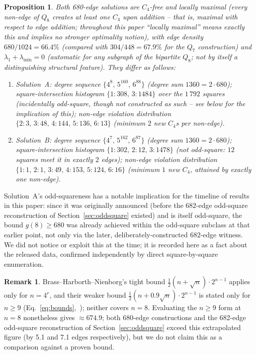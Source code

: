 \documentclass[12pt,a4paper]{article}
\newtheorem{proposition}[theorem]{Proposition}
\theoremstyle{definition}
\newtheorem{remark}[theorem]{Remark}
\begin{document}
\begin{proposition}\label{prop:q8struct}
Both 680-edge solutions are $C_4$-free and locally maximal (every
non-edge of $Q_8$ creates at least one $C_4$ upon addition -- that is,
maximal with respect to edge addition; throughout this paper ``locally
maximal'' means exactly this and implies no stronger optimality
notion), with edge
density $680/1024=66.4\%$ (compared with $304/448=67.9\%$ for the $Q_7$
construction) and $\lambda_1+\lambda_{\min}=0$ (automatic for any subgraph of
the bipartite $Q_8$; not by itself a distinguishing structural feature).
They differ as follows:
\begin{enumerate}[label=(\roman*)]
  \item Solution~A: degree sequence $\{4^8,\,5^{160},\,6^{88}\}$
    (degree sum $1360=2\cdot680$); square-intersection histogram
    $\{1\!:\!308,\,3\!:\!1484\}$ over the $1\,792$ squares (incidentally
    odd-square, though not constructed as such -- see below for the
    implication of this); non-edge violation
    distribution $\{2\!:\!3,\,3\!:\!48,\,4\!:\!144,\,5\!:\!136,\,6\!:\!13\}$
    (minimum $2$ new $C_4$s per non-edge).
  \item Solution~B: degree sequence $\{4^7,\,5^{162},\,6^{87}\}$
    (degree sum $1360=2\cdot680$); square-intersection histogram
    $\{1\!:\!302,\,2\!:\!12,\,3\!:\!1478\}$ (not odd-square: $12$ squares
    meet it in exactly $2$ edges); non-edge violation distribution
    $\{1\!:\!1,\,2\!:\!1,\,3\!:\!49,\,4\!:\!153,\,5\!:\!124,\,6\!:\!16\}$
    (minimum $1$ new $C_4$, attained by exactly one non-edge).
\end{enumerate}
\end{proposition}

Solution~A's odd-squareness has a notable implication for the timeline
of results in this paper: since it was originally announced (before
the $682$-edge odd-square reconstruction of
Section~\ref{sec:oddsquare} existed) and is itself odd-square, the
bound $g(8)\ge680$ was already achieved within the odd-square subclass
at that earlier point, not only via the later, deliberately-constructed
$682$-edge witness. We did not notice or exploit this at the time; it
is recorded here as a fact about the released data, confirmed
independently by direct square-by-square enumeration.

\begin{remark}
Brass--Harborth--Nienborg's tight bound $\tfrac12(n+\sqrt n)\cdot2^{n-1}$
applies only for $n=4^r$, and their weaker bound
$\tfrac12(n+0.9\sqrt n)\cdot2^{n-1}$ is stated only for $n\ge9$
(Eq.~\eqref{eq:bounds},~\cite{BHN95}); neither covers $n=8$. Evaluating
the $n\ge9$ form at $n=8$ nonetheless gives $\approx674.9$; both
680-edge constructions and the 682-edge odd-square reconstruction of
Section~\ref{sec:oddsquare} exceed this extrapolated figure (by 5.1 and
7.1 edges respectively), but we do not claim this as a comparison
against a proven bound.
\end{remark}
\end{document}
